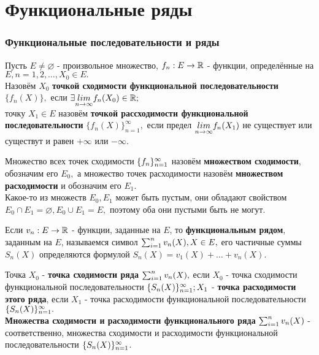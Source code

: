 \documentclass[main]{subfiles}
\begin{document}
\chapter{Функциональные ряды}
\subsection{Функциональные последовательности и ряды}
\begin{definition} 
    Пусть $E\neq\varnothing$ - произвольное множество, $f_n:E\to{\vR}$ - функции,
     определённые на $E, n=1,2,\ldots, X_0\in E.$\\ Назовём $X_0$
      \textbf{точкой сходимости функциональной последовательности} $\{f_n(X)\},$ если $
       \exists \underset{n\to\infty}{lim}f_n(X_0)\in{\vR};$\\
        точку $X_1\in E$ 
       назовём \textbf{точкой рассходимости функциональной последовательности} $\{f_n(X)\}_{n=1}^\infty,$ 
       если предел $\Lim f_n(X_1)$ не существует или существут и равен $+\infty$ или $-\infty$.
\end{definition}
\begin{definition}
        Множество всех точек сходимости $\fnn$ назовём \textbf{множеством сходимости}, обозначим его $E_0,$ 
        а множество точек расходимости назовём \textbf{множеством расходимости} и обозначим его $E_1$. \\
        Какое-то из множеств $E_0, E_1$ может быть пустым, они обладают свойством
         $E_0\cap E_1=\varnothing, E_0\cup E_1=E,$
         поэтому оба они пустыми быть не могут. \end{definition}
         \begin{definition}
Если $v_n:E\to {\vR}$ - функции, заданные на $E$, то \textbf{функциональным рядом}, заданным на $E$,
 называемся символ $\sumn v_n(X), X\in E,$ его частичные суммы $S_n(X)$ определяются формулой
  $S_n(X)=v_1(X)+\dots+v_n(X).$ \end{definition}
  \begin{definition}
Точка $X_0$ - \textbf{точка сходимости ряда} $\sumn v_n(X),$ если $X_0$ - 
точка сходимости функциональной последовательности $\fnn[S_n(X)];
 X_1$ -
 \textbf{точка расходимости этого ряда}, если $X_1$ - точка расходимости 
 функциональной последовательности $\fnn[S_n(X)].$\\ 
 \textbf{Множества сходимости и расходимости функционального ряда}
  $\sumn v_n(X)$ - соответственно, множества сходимости и расходимости
   функциональной последовательности $\fnn[S_n(X)]$. 
\end{definition}
\end{document}

